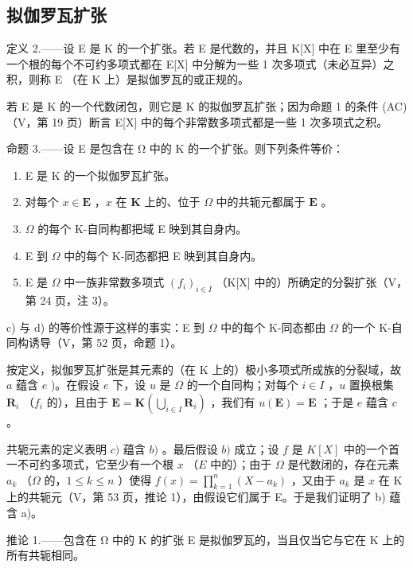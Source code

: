 \subsection{拟伽罗瓦扩张}

定义 2.——设 E 是 K 的一个扩张。若 E 是代数的，并且 K{[}X{]} 中在 E 里至少有一个根的每个不可约多项式都在 E{[}X{]} 中分解为一些 1 次多项式（未必互异）之积，则称 E （在 K 上）是拟伽罗瓦的或正规的。

若 E 是 K 的一个代数闭包，则它是 K 的拟伽罗瓦扩张；因为命题 1 的条件 (AC)（V，第 19 页）断言 E{[}X{]} 中的每个非常数多项式都是一些 1 次多项式之积。

命题 3.——设 E 是包含在 Ω 中的 K 的一个扩张。则下列条件等价：

\begin{enumerate}
\def\labelenumi{\alph{enumi})}
\item
  E 是 K 的一个拟伽罗瓦扩张。
\item
  对每个 \(x \in \mathbf{E}\) ，\(x\) 在 \(\mathbf{K}\) 上的、位于 \(\Omega\) 中的共轭元都属于 \(\mathbf{E}\) 。
\item
  \(\Omega\) 的每个 K-自同构都把域 E 映到其自身内。
\item
  E 到 \(\Omega\) 中的每个 K-同态都把 E 映到其自身内。
\item
  E 是 \(\Omega\) 中一族非常数多项式 \((f_i)_{i\in I}\) （K{[}X{]} 中的）所确定的分裂扩张（V，第 24 页，注 3）。
\end{enumerate}

c) 与 d) 的等价性源于这样的事实：E 到 \(\Omega\) 中的每个 K-同态都由 \(\Omega\) 的一个 K-自同构诱导（V，第 52 页，命题 1）。

按定义，拟伽罗瓦扩张是其元素的（在 K 上的）极小多项式所成族的分裂域，故 \(a\) 蕴含 \(e\) )。在假设 \(e\) 下，设 \(u\) 是 \(\Omega\) 的一个自同构；对每个 \(i \in I\) ，\(u\) 置换根集 \(\mathbf{R}_i\) （\(f_i\) 的），且由于 \(\mathbf{E} = \mathbf{K}\left(\bigcup_{i \in I} \mathbf{R}_i\right)\) ，我们有 \(u(\mathbf{E}) = \mathbf{E}\) ；于是 \(e\) 蕴含 \(c\) 。

共轭元素的定义表明 \(c)\) 蕴含 \(b)\) 。最后假设 \(b)\) 成立；设 \(f\) 是 \(K[X]\) 中的一个首一不可约多项式，它至少有一个根 \(x\) （\(E\) 中的）；由于 \(\Omega\) 是代数闭的，存在元素 \(a_k\) （\(\Omega\) 的，\(1 \leqslant k \leqslant n\) ）使得 \(f(x) = \prod_{k=1}^{n} (X - a_k)\) ，又由于 \(a_k\) 是 \(x\) 在 K 上的共轭元（V，第 53 页，推论 1），由假设它们属于 E。于是我们证明了 b) 蕴含 a)。

推论 1.——包含在 Ω 中的 K 的扩张 E 是拟伽罗瓦的，当且仅当它与它在 K 上的所有共轭相同。

